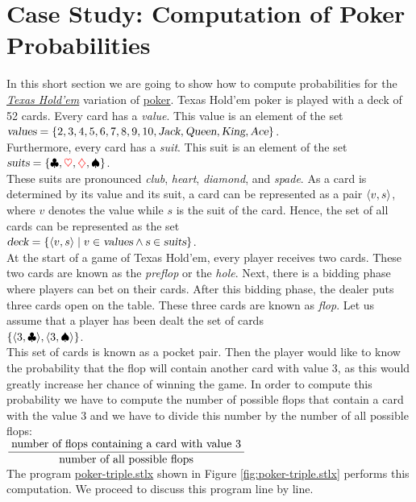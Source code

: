 \section{Case Study: Computation of Poker Probabilities}
In this short section we are going to show how to compute probabilities for the
\href{https://en.wikipedia.org/wiki/Texas_hold_%27em}{\textsl{Texas Hold'em}} variation of 
\href{https://en.wikipedia.org/wiki/Poker}{poker}.   Texas Hold'em poker is played with a deck of 52
cards.  Every card has a \emph{value}.  This value is an element of the set
\\[0.2cm]
\hspace*{1.3cm} 
$\textsl{values} = \{ 2, 3, 4, 5, 6, 7, 8, 9, 10, \textsl{Jack}, \textsl{Queen}, \textsl{King}, \textsl{Ace} \}$.
\\[0.2cm]
Furthermore, every card has a \emph{suit}.  This suit is an element of the set
\\[0.2cm]
\hspace*{1.3cm} 
$\textsl{suits} = \{ \clubsuit , \mbox{$\color{red}{\ensuremath{\heartsuit }}$}, \mbox{$\color{red}{\diamondsuit}$}, \spadesuit  \}$.
\\[0.2cm]
These suits are pronounced \emph{club}, \emph{heart}, \emph{diamond}, and \emph{spade}.
As a card is determined by its value and its suit, a card can be represented as a pair $\pair(v,s)$, where $v$
denotes the value while $s$ is the suit of the card.  Hence, the set of all cards can be represented as the set
\\[0.2cm]
\hspace*{1.3cm} 
$\textsl{deck} = \{ \pair(v,s) \mid v \in \textsl{values} \wedge \textsl{s} \in \textsl{suits} \}$.
\\[0.2cm]
At the start of a game of Texas Hold'em, every player receives two cards.  These two cards are known
as the \emph{preflop} or the \emph{hole}.  Next, there is a bidding phase where players can bet on their
cards.   After this bidding phase, the dealer puts three cards open on the table.  These three cards are
known as \emph{flop}.  Let us assume that a player has been dealt the set of cards
\\[0.2cm]
\hspace*{1.3cm}
$\{ \pair(3, \club), \pair(3, \spade) \}$.
\\[0.2cm]
This set of cards is known as a pocket pair.  Then the player would like to know the probability
that the flop will contain another card with value $3$, as this would greatly increase her chance of
winning the game.  In order to compute this probability we have to compute the number of possible
flops that contain a card with the value $3$ and we have to divide this number by the number of all
possible flops:
\\[0.2cm]
\hspace*{1.3cm}
$\displaystyle \frac{\;\mbox{number of flops containing a card with value $3$}\;}{\mbox{number of all possible flops}}$
\\[0.2cm]
The program
\href{https://github.com/karlstroetmann/Logik/blob/master/SetlX/poker-triple.stlx}{poker-triple.stlx}
shown in Figure \ref{fig:poker-triple.stlx} performs this computation.  We proceed to discuss this
program line by line.


